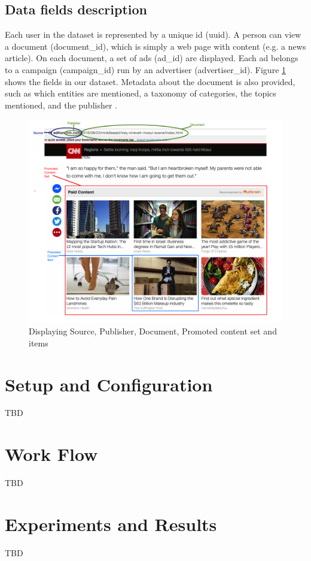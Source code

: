 \documentclass[9pt,twocolumn,twoside]{styles/osajnl}
\begin{document}
\subsection{Data fields description}
Each user in the dataset is represented by a unique id (uuid). A person can view a document (document\_id), which is simply a web page with content (e.g.  a news article). On each document, a set of ads (ad\_id) are displayed. Each ad belongs to a campaign (campaign\_id) run by an advertiser (advertiser\_id). Figure \ref{fig:OutbrainData} shows the fields in our dataset. Metadata about the document is also provided, such as which entities are mentioned, a taxonomy of categories, the topics mentioned, and the publisher \cite{kaggle-outbrain}.

\begin{figure}[htbp]
\centering
\includegraphics[width=\linewidth]{images/page_view.png}
\caption{Displaying Source, Publisher, Document, Promoted content set and items \cite{kaggle-outbrain}}
\label{fig:OutbrainData}
\end{figure}

\section{Setup and Configuration}
TBD

\section{Work Flow}
TBD

\section{Experiments and Results}
TBD
\end{document}
